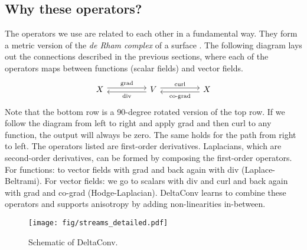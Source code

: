 \documentclass[acmtog, authorversion]{acmart}
\begin{document}
\subsection{Why these operators?}
The operators we use are related to each other in a fundamental way. They form a metric version of the \textit{de Rham complex} of a surface \cite{Wardetzky2006}. The following diagram lays out the connections described in the previous sections, where each of the operators maps between functions (scalar fields) and vector fields.
\begin{equation}
    \begin{tikzcd}
    X \arrow[rr, "\text{grad}", shift left]
        &
        & V \arrow[ll, "\text{div}", shift left]
            \arrow[rr, "\text{curl}", shift left]
            &
            & X \arrow[ll, "\text{co-grad}", shift left]
    \end{tikzcd}
\end{equation}
Note that the bottom row is a 90-degree rotated version of the top row. If we follow the diagram from left to right and apply grad and then curl to any function, the output will always be zero. The same holds for the path from right to left. The operators listed are first-order derivatives. Laplacians, which are second-order derivatives, can be formed by composing the first-order operators. For functions: to vector fields with grad and back again with div (Laplace-Beltrami). For vector fields: we go to scalars with div and curl and back again with grad and co-grad (Hodge-Laplacian). DeltaConv learns to combine these operators and supports anisotropy by adding non-linearities in-between.

\begin{figure}[t]
    \centering
    \texttt{[image: fig/streams\_detailed.pdf]}
    \caption{Schematic of DeltaConv.}
    \label{fig:streams}
\end{figure}
\end{document}
